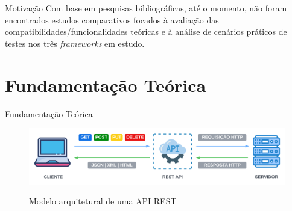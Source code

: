 \documentclass{libs/ufc_format}
\begin{document}
\begin{frame}{Motivação}
    Com base em pesquisas bibliográficas, até o momento, não foram encontrados estudos comparativos focados à avaliação das compatibilidades/funcionalidades teóricas e à análise de cenários práticos de testes nos três \textit{frameworks} em estudo.
\end{frame}

\section{Fundamentação Teórica}
\begin{frame}{Fundamentação Teórica}
    \begin{figure}[H]
        \centering
        \caption{Modelo arquitetural de uma API REST}
        \includegraphics[width=1\linewidth]{figuras/modelo-rest-api.png}
        \captionsetup{justification=centering}
        \label{fig:modelo-rest-api}
    \end{figure}
\end{frame}
\end{document}
